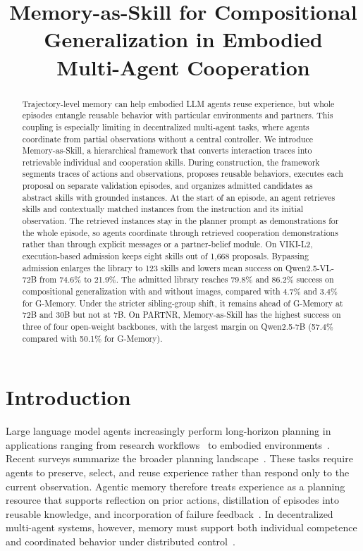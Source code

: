 \documentclass{article}
\title{Memory-as-Skill for Compositional\\Generalization in Embodied\\Multi-Agent Cooperation}
\author{}
\theoremstyle{plain}
\theoremstyle{definition}
\theoremstyle{remark}
\begin{document}
 
 
\maketitle
 
 
\begin{abstract}
  Trajectory-level memory can help embodied LLM agents reuse experience, but whole episodes entangle reusable behavior with particular environments and partners. This coupling is especially limiting in decentralized multi-agent tasks, where agents coordinate from partial observations without a central controller. We introduce Memory-as-Skill, a hierarchical framework that converts interaction traces into retrievable individual and cooperation skills. During construction, the framework segments traces of actions and observations, proposes reusable behaviors, executes each proposal on separate validation episodes, and organizes admitted candidates as abstract skills with grounded instances. At the start of an episode, an agent retrieves skills and contextually matched instances from the instruction and its initial observation. The retrieved instances stay in the planner prompt as demonstrations for the whole episode, so agents coordinate through retrieved cooperation demonstrations rather than through explicit messages or a partner-belief module. On VIKI-L2, execution-based admission keeps eight skills out of 1{,}668 proposals. Bypassing admission enlarges the library to 123 skills and lowers mean success on Qwen2.5-VL-72B from 74.6\% to 21.9\%. The admitted library reaches 79.8\% and 86.2\% success on compositional generalization with and without images, compared with 4.7\% and 3.4\% for G-Memory. Under the stricter sibling-group shift, it remains ahead of G-Memory at 72B and 30B but not at 7B. On PARTNR, Memory-as-Skill has the highest success on three of four open-weight backbones, with the largest margin on Qwen2.5-7B (57.4\% compared with 50.1\% for G-Memory).
\end{abstract}

\raggedbottom
 
\section{Introduction}
\label{sec:intro}
 
Large language model agents increasingly perform long-horizon planning in applications ranging from research workflows~\citep{zheng2025deepresearcher} to embodied environments~\citep{ahn2022can,erdogan2025plan}. Recent surveys summarize the broader planning landscape~\citep{aghzal2025survey,cao2025large}. These tasks require agents to preserve, select, and reuse experience rather than respond only to the current observation. Agentic memory therefore treats experience as a planning resource that supports reflection on prior actions, distillation of episodes into reusable knowledge, and incorporation of failure feedback~\citep{zhang2024survey,xu2025mem,shinn2024reflexion}. In decentralized multi-agent systems, however, memory must support both individual competence and coordinated behavior under distributed control~\citep{dorigo2021swarm,zhang2018fully}.
 
\end{document}
